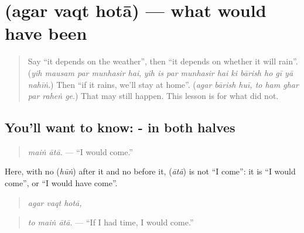 \section[\texorpdfstring{\ur{اگر} \ur{وقت} \ur{ہوتا} (agar vaqt hotā)}{اگر وقت ہوتا (agar vaqt hotā)}]{   (agar vaqt hotā) — what would have been}

\label{lesson:UR-C275-agar-vaqt-hota}



\begin{quote}
Say \textquotedblleft{}it depends on the weather\textquotedblright{}, then \textquotedblleft{}it depends on whether it will rain\textquotedblright{}. (\emph{yih mausam par munhasir hai}, \emph{yih is par munhasir hai ki bārish ho gī yā nahīṅ}.) Then \textquotedblleft{}if it rains, we'll stay at home\textquotedblright{}. (\emph{agar bārish huī, to ham ghar par raheṅ ge}.) That may still happen. This lesson is for what did not.
\end{quote}

\subsection*{You'll want to know: - in both halves}
\begin{quote}
\textbf{ }
\end{quote}

\begin{quote}
\emph{maiṅ ātā.} — \textquotedblleft{}I would come.\textquotedblright{}
\end{quote}

Here, with no \textbf{} (\emph{hūṅ}) after it and no \textbf{} before it, \textbf{} (\emph{ātā}) is not \textquotedblleft{}I come\textquotedblright{}: it is \textquotedblleft{}I would come\textquotedblright{}, or \textquotedblleft{}I would have come\textquotedblright{}.

\begin{quote}
\textbf{  }
\end{quote}

\begin{quote}
\emph{agar vaqt hotā,}
\end{quote}

\begin{quote}
\textbf{  }
\end{quote}

\begin{quote}
\emph{to maiṅ ātā.} — \textquotedblleft{}If I had time, I would come.\textquotedblright{}
\end{quote}

